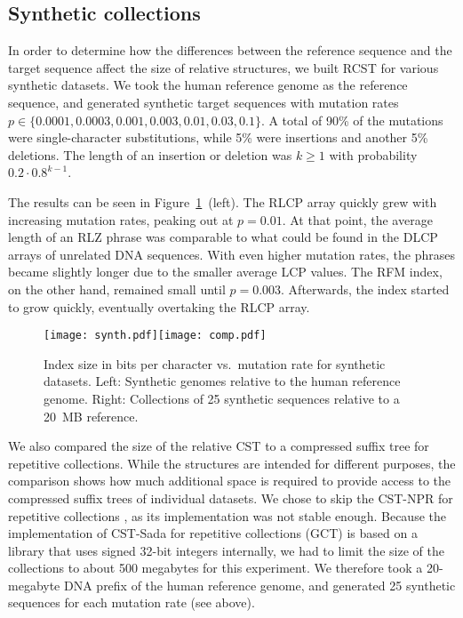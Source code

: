 \documentclass[a4paper,11pt]{llncs}
\newcommand{\set}[1]{\ensuremath{\{ #1 \}}}
\newcommand{\CST}{\textsf{CST}}
\newcommand{\CSTsada}{\textsf{CST\nobreakdash-Sada}}
\newcommand{\GCT}{\textsf{GCT}}
\newcommand{\CSTnpr}{\textsf{CST\nobreakdash-NPR}}
\newcommand{\RCST}{\textsf{RCST}}
\newcommand{\RFM}{\textsf{RFM}}
\newcommand{\LCP}{\textsf{LCP}}
\newcommand{\DLCP}{\textsf{DLCP}}
\newcommand{\RLCP}{\textsf{RLCP}}
\newcommand{\RLZ}{\textsf{RLZ}}
\begin{document}
\subsection{Synthetic collections}

In order to determine how the differences between the reference sequence and the target sequence affect the size of relative structures, we built \RCST{} for various synthetic datasets. We took the human reference genome as the reference sequence, and generated synthetic target sequences with mutation rates $p \in \set{0.0001, 0.0003, 0.001, 0.003, 0.01, 0.03, 0.1}$. A total of 90\% of the mutations were single-character substitutions, while 5\% were insertions and another 5\% deletions. The length of an insertion or deletion was $k \ge 1$ with probability $0.2 \cdot 0.8^{k-1}$.

The results can be seen in Figure~\ref{fig:synthetic}~(left). The \RLCP{} array quickly grew with increasing mutation rates, peaking out at $p = 0.01$. At that point, the average length of an \RLZ{} phrase was comparable to what could be found in the \DLCP{} arrays of unrelated DNA sequences. With even higher mutation rates, the phrases became slightly longer due to the smaller average \LCP{} values. The \RFM{} index, on the other hand, remained small until $p = 0.003$. Afterwards, the index started to grow quickly, eventually overtaking the \RLCP{} array.

\begin{figure}
\begin{center}
\texttt{[image: synth.pdf]}\hspace{-0.4in}\texttt{[image: comp.pdf]}
\end{center}
\caption{Index size in bits per character vs.~mutation rate for synthetic datasets. Left: Synthetic genomes relative to the human reference genome. Right: Collections of 25 synthetic sequences relative to a 20~MB reference.}\label{fig:synthetic}
\end{figure}

We also compared the size of the relative \CST{} to a compressed suffix tree for repetitive collections. While the structures are intended for different purposes, the comparison shows how much additional space is required to provide access to the compressed suffix trees of individual datasets. We chose to skip the \CSTnpr{} for repetitive collections \cite{Abeliuk2013}, as its implementation was not stable enough. Because the implementation of \CSTsada{} for repetitive collections (\GCT) \cite{Navarro2014} is based on a library that uses signed 32\nobreakdash-bit integers internally, we had to limit the size of the collections to about 500 megabytes for this experiment. We therefore took a 20\nobreakdash-megabyte DNA prefix of the human reference genome, and generated 25 synthetic sequences for each mutation rate (see above).
\end{document}
